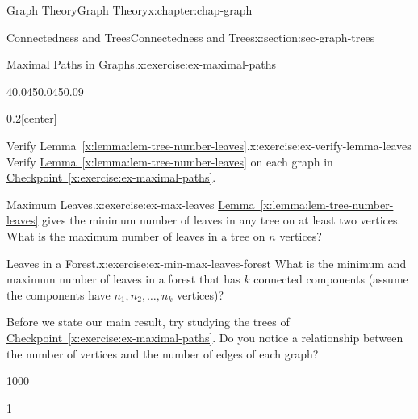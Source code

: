 \documentclass[oneside,10pt,]{book}
\newcommand{\xreffont}{\relax}
\numberwithin{equation}{section}
\newlength{\qrsize}
\newlength{\previewwidth}
\begin{document}
\begin{chapterptx}{Graph Theory}{}{Graph Theory}{}{}{x:chapter:chap-graph}
\begin{sectionptx}{Connectedness and Trees}{}{Connectedness and Trees}{}{}{x:section:sec-graph-trees}
\begin{inlineexercise}{Maximal Paths in Graphs.}{x:exercise:ex-maximal-paths}
\begin{sidebyside}{4}{0.045}{0.045}{0.09}
\begin{sbspanel}{0.2}[center]
{
}%
\end{sbspanel}%
\end{sidebyside}%
\end{inlineexercise}%
\begin{inlineexercise}{Verify Lemma~{\xreffont\ref*{x:lemma:lem-tree-number-leaves}}.}{x:exercise:ex-verify-lemma-leaves}%
Verify \hyperref[x:lemma:lem-tree-number-leaves]{Lemma~{\xreffont\ref{x:lemma:lem-tree-number-leaves}}} on each graph in \hyperref[x:exercise:ex-maximal-paths]{Checkpoint~{\xreffont\ref{x:exercise:ex-maximal-paths}}}.%
\end{inlineexercise}%
\begin{inlineexercise}{Maximum Leaves.}{x:exercise:ex-max-leaves}%
\hyperref[x:lemma:lem-tree-number-leaves]{Lemma~{\xreffont\ref{x:lemma:lem-tree-number-leaves}}} gives the minimum number of leaves in any tree on at least two vertices. What is the maximum number of leaves in a tree on \(n\) vertices?%
\end{inlineexercise}%
\begin{inlineexercise}{Leaves in a Forest.}{x:exercise:ex-min-max-leaves-forest}%
What is the minimum and maximum number of leaves in a forest that has \(k\) connected components (assume the components have \(n_1, n_2, \ldots, n_k\) vertices)?%
\end{inlineexercise}%
Before we state our main result, try studying the trees of \hyperref[x:exercise:ex-maximal-paths]{Checkpoint~{\xreffont\ref{x:exercise:ex-maximal-paths}}}. Do you notice a relationship between the number of vertices and the number of edges of each graph?%
\begin{sidebyside}{1}{0}{0}{0}%
\begin{sbspanel}{1}%
\setlength{\qrsize}{9em}
\setlength{\previewwidth}{\linewidth}
\addtolength{\previewwidth}{-\qrsize}
\begin{tcbraster}[raster columns=2, raster column skip=1pt, raster halign=center, raster force size=false, raster left skip=0pt, raster right skip=0pt]%
\begin{tcolorbox}[previewstyle, width=\previewwidth]%

\end{tcolorbox}
\end{tcbraster}
\end{sbspanel}
\end{sidebyside}
\end{sectionptx}
\end{chapterptx}
\end{document}
